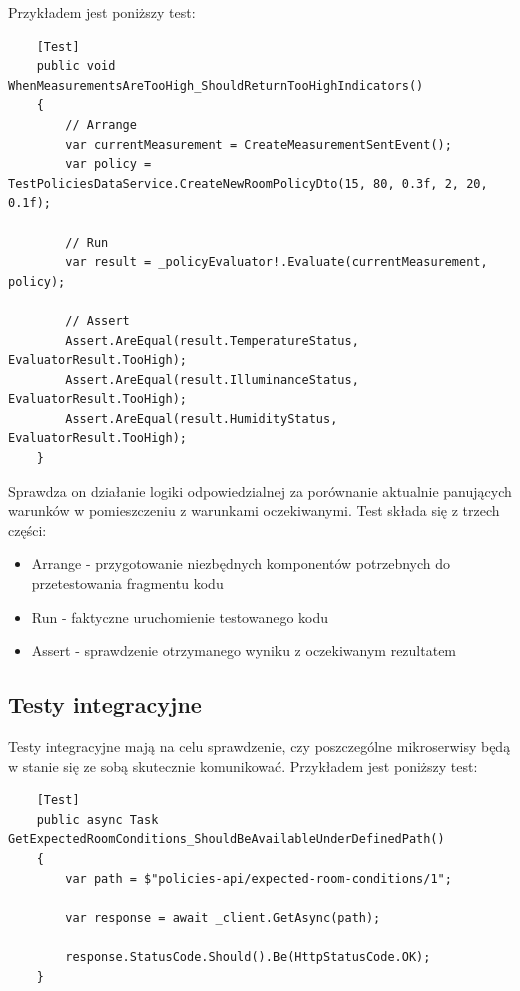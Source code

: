 \documentclass[11pt, a4]{article} %
\begin{document}
Przykładem jest poniższy test:

\begin{lstlisting}
    [Test]
    public void WhenMeasurementsAreTooHigh_ShouldReturnTooHighIndicators()
    {
        // Arrange
        var currentMeasurement = CreateMeasurementSentEvent();
        var policy = TestPoliciesDataService.CreateNewRoomPolicyDto(15, 80, 0.3f, 2, 20, 0.1f);

        // Run
        var result = _policyEvaluator!.Evaluate(currentMeasurement, policy);
        
        // Assert
        Assert.AreEqual(result.TemperatureStatus, EvaluatorResult.TooHigh);
        Assert.AreEqual(result.IlluminanceStatus, EvaluatorResult.TooHigh);
        Assert.AreEqual(result.HumidityStatus, EvaluatorResult.TooHigh);
    }
\end{lstlisting}

Sprawdza on działanie logiki odpowiedzialnej za porównanie aktualnie panujących 
warunków w pomieszczeniu z warunkami oczekiwanymi. Test składa się z trzech części:

\begin{itemize} %
    \item Arrange - przygotowanie niezbędnych komponentów potrzebnych do przetestowania 
    fragmentu kodu
    \item Run - faktyczne uruchomienie testowanego kodu
    \item Assert - sprawdzenie otrzymanego wyniku z oczekiwanym rezultatem
\end{itemize}

\subsection{Testy integracyjne}

Testy integracyjne mają na celu sprawdzenie, czy poszczególne mikroserwisy będą 
w stanie się ze sobą skutecznie komunikować. Przykładem jest poniższy test:

\begin{lstlisting}
    [Test]
    public async Task GetExpectedRoomConditions_ShouldBeAvailableUnderDefinedPath()
    {
        var path = $"policies-api/expected-room-conditions/1";
    
        var response = await _client.GetAsync(path);
    
        response.StatusCode.Should().Be(HttpStatusCode.OK);
    }    
\end{lstlisting}
\end{document}
